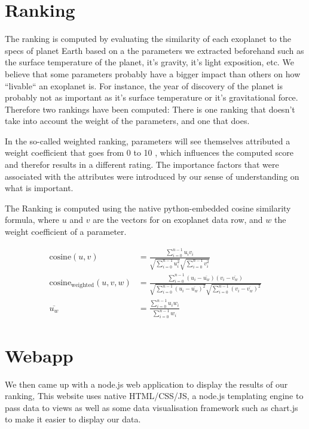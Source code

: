 \documentclass[12p]{article}
\begin{document}

\section{Ranking}
The ranking is computed by evaluating the similarity of each exoplanet to the specs of planet Earth based on a the parameters we extracted beforehand such as the surface temperature of the planet, it’s gravity, it’s light exposition, etc. We believe that some parameters probably have a bigger impact than others on how ``livable`` an exoplanet is. For instance, the year of discovery of the planet is probably not as important as it's surface temperature or it's gravitational force. Therefore two rankings have been computed: There is one ranking that doesn't take into account the weight of the parameters, and one that does.

In the so-called weighted ranking, parameters will see themselves attributed a weight coefficient that goes from 0 to 10 , which influences the computed score and therefor results in a different rating. The importance factors that were associated with the attributes were introduced by our sense of understanding on what is important.

The Ranking is computed using the native python-embedded cosine similarity formula, where $u$ and $v$ are the vectors for on exoplanet data row, and $w$ the weight coefficient of a parameter.

\begin{align}
\text{cosine}(u,v) &= \frac{\sum_{i=0}^{n-1} u_iv_i  }{ \sqrt{\sum_{i=0}^{n-1} u_i^2  } \sqrt{\sum_{i=0}^{n-1} v_i^2  }} \label{eq:cosine}\\
\text{cosine}_{\text{weighted}}(u,v,w) &= \frac{\sum_{i=0}^{n-1} (u_i-\overline{u_w})(v_i-\overline{v_w})  }{ \sqrt{\sum_{i=0}^{n-1} (u_i-\overline{u_w})^2  } \sqrt{\sum_{i=0}^{n-1} (v_i-\overline{v_w})^2  }} \label{eq:cosine_weighted} \\
\overline{u_w} &= \frac{ \sum_{i=0}^{n-1} u_iw_i }{ \sum_{i=0}^{n-1} w_i } \label{eq:weighted_mean}
\end{align}


\section{Webapp}
We then came up with a node.js web application to display the results of our ranking, This website uses native HTML/CSS/JS, a node.js templating engine to pass data to views as well as some data visualisation framework such as chart.js to make it easier to display our data.
\end{document}
